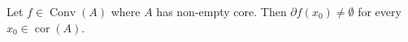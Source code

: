 Let $f\in\operatorname{Conv}(A)$ where $A$ has non-empty core. Then $\partial f(x_0)\neq\emptyset$ for every $x_0\in\operatorname{cor}(A)$.
